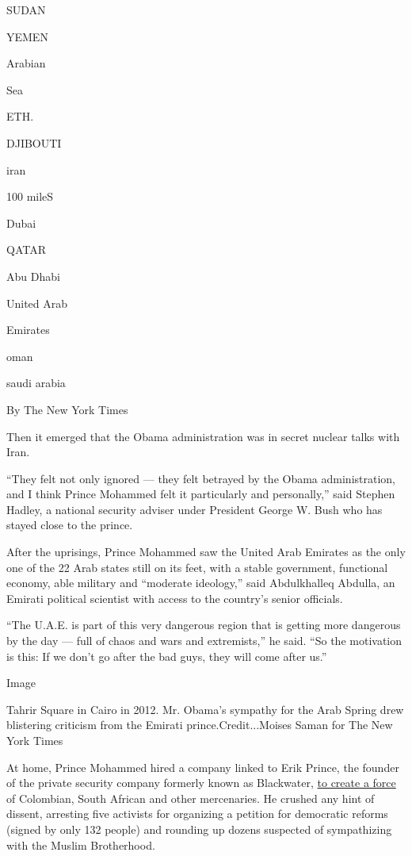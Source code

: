 SUDAN

YEMEN

Arabian

Sea

ETH.

DJIBOUTI

iran

100 mileS

Dubai

QATAR

Abu Dhabi

United Arab

Emirates

oman

saudi arabia

By The New York Times

Then it emerged that the Obama administration was in secret nuclear
talks with Iran.

``They felt not only ignored --- they felt betrayed by the Obama
administration, and I think Prince Mohammed felt it particularly and
personally,'' said Stephen Hadley, a national security adviser under
President George W. Bush who has stayed close to the prince.

After the uprisings, Prince Mohammed saw the United Arab Emirates as the
only one of the 22 Arab states still on its feet, with a stable
government, functional economy, able military and ``moderate ideology,''
said Abdulkhalleq Abdulla, an Emirati political scientist with access to
the country's senior officials.

``The U.A.E. is part of this very dangerous region that is getting more
dangerous by the day --- full of chaos and wars and extremists,'' he
said. ``So the motivation is this: If we don't go after the bad guys,
they will come after us.''

Image

Tahrir Square in Cairo in 2012. Mr. Obama's sympathy for the Arab Spring
drew blistering criticism from the Emirati prince.Credit...Moises Saman
for The New York Times

At home, Prince Mohammed hired a company linked to Erik Prince, the
founder of the private security company formerly known as Blackwater,
\href{https://www.nytimes.com/2011/05/15/world/middleeast/15prince.html}{to
create a force} of Colombian, South African and other mercenaries. He
crushed any hint of dissent, arresting five activists for organizing a
petition for democratic reforms (signed by only 132 people) and rounding
up dozens suspected of sympathizing with the Muslim Brotherhood.

